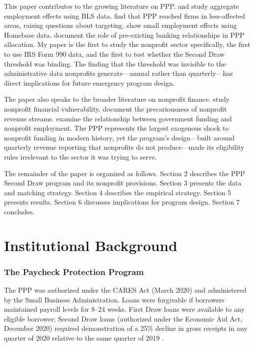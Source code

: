 \documentclass[12pt]{article}
\begin{document}
This paper contributes to the growing literature on PPP. \citet{autor2022} and \citet{hubbard2020} study aggregate employment effects using BLS data. \citet{granja2022} find that PPP reached firms in less-affected areas, raising questions about targeting. \citet{chetty2024} show small employment effects using Homebase data. \citet{bartik2020} document the role of pre-existing banking relationships in PPP allocation. My paper is the first to study the nonprofit sector specifically, the first to use IRS Form 990 data, and the first to test whether the Second Draw threshold was binding. The finding that the threshold was invisible to the administrative data nonprofits generate---annual rather than quarterly---has direct implications for future emergency program design.

The paper also speaks to the broader literature on nonprofit finance. \citet{calabrese2013} study nonprofit financial vulnerability. \citet{hager2004} document the precariousness of nonprofit revenue streams. \citet{leroux2017} examine the relationship between government funding and nonprofit employment. The PPP represents the largest exogenous shock to nonprofit funding in modern history, yet the program's design---built around quarterly revenue reporting that nonprofits do not produce---made its eligibility rules irrelevant to the sector it was trying to serve.

The remainder of the paper is organized as follows. Section 2 describes the PPP Second Draw program and its nonprofit provisions. Section 3 presents the data and matching strategy. Section 4 describes the empirical strategy. Section 5 presents results. Section 6 discusses implications for program design. Section 7 concludes.


\section{Institutional Background}

\subsubsection*{The Paycheck Protection Program} The PPP was authorized under the CARES Act (March 2020) and administered by the Small Business Administration. Loans were forgivable if borrowers maintained payroll levels for 8--24 weeks. First Draw loans were available to any eligible borrower; Second Draw loans (authorized under the Economic Aid Act, December 2020) required demonstration of a 25\% decline in gross receipts in any quarter of 2020 relative to the same quarter of 2019 \citep{sba2021}.
\end{document}
